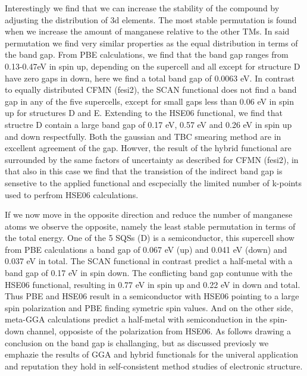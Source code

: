 Interestingly we find that we can increase the stability of the compound by adjusting the distribution of 3d elements. The most stable permutation is found when we increase the amount of manganese relative to the other TMs. In said permutation we find very similar properties as the equal distribution in terms of the band gap. From PBE calculations, we find that the band gap ranges from 0.13-0.47eV in spin up, depending on the supercell and all except for structure D have zero gaps in down, here we find a total band gap of 0.0063 eV. In contrast to equally distributed CFMN (fesi2), the SCAN functional does not find a band gap in any of the five supercells, except for small gaps less than 0.06 eV in spin up for structures D and E. Extending to the HSE06 functional, we find that structre D contain a large band gap of 0.17 eV, 0.57 eV and 0.26 eV in spin up and down respectfully. Both the gaussian and TBC smearing method are in excellent agreement of the gap. Howver, the result of the hybrid functional are surrounded by the same factors of uncertainty as described for CFMN (fesi2), in that also in this case we find that the transistion of the indirect band gap is sensetive to the applied functional and escpecially the limited number of k-points used to perfrom HSE06 calculations.

If we now move in the opposite direction and reduce the number of manganese atoms we observe the opposite, namely the least stable permutation in terms of the total energy. One of the 5 SQSs (D) is a semiconductor, this supercell show from PBE calculations a band gap of 0.067 eV (up) and 0.041 eV (down) and 0.037 eV in total. The SCAN functional in contrast predict a half-metal with a band gap of 0.17 eV in spin down. The conflicting band gap contunue with the HSE06 functional, resulting in 0.77 eV in spin up and 0.22 eV in down and total. Thus PBE and HSE06 result in a semiconductor with HSE06 pointing to a large spin polarization and PBE finding symetric spin values. And on the other side, meta-GGA calculations predict a half-metal with semiconduction in the spin-down channel, opposiste of the polarization from HSE06. As follows drawing a conclusion on the band gap is challanging, but as discussed previosly we emphazie the results of GGA and hybrid functionals for the univeral application and reputation they hold in self-consistent method studies of electronic structure. 

